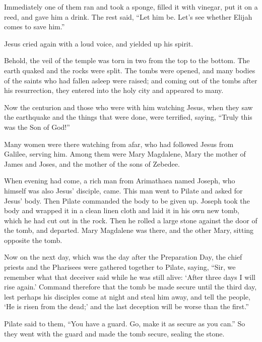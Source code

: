  Immediately one of them ran and took a sponge, filled it
with vinegar, put it on a reed, and gave him a drink. 
The rest said, ``Let him be. Let's see whether Elijah comes to save
him.''

 Jesus cried again with a loud voice, and yielded up his
spirit.

 Behold, the veil of the temple was torn in two from the
top to the bottom. The earth quaked and the rocks were split.
 The tombs were opened, and many bodies of the saints who
had fallen asleep were raised;  and coming out of the
tombs after his resurrection, they entered into the holy city and
appeared to many.

 Now the centurion and those who were with him watching
Jesus, when they saw the earthquake and the things that were done, were
terrified, saying, ``Truly this was the Son of God!''

 Many women were there watching from afar, who had
followed Jesus from Galilee, serving him.  Among them
were Mary Magdalene, Mary the mother of James and Joses, and the mother
of the sons of Zebedee.

 When evening had come, a rich man from Arimathaea named
Joseph, who himself was also Jesus' disciple, came.  This
man went to Pilate and asked for Jesus' body. Then Pilate commanded the
body to be given up.  Joseph took the body and wrapped it
in a clean linen cloth  and laid it in his own new tomb,
which he had cut out in the rock. Then he rolled a large stone against
the door of the tomb, and departed.  Mary Magdalene was
there, and the other Mary, sitting opposite the tomb.

 Now on the next day, which was the day after the
Preparation Day, the chief priests and the Pharisees were gathered
together to Pilate,  saying, ``Sir, we remember what that
deceiver said while he was still alive: `After three days I will rise
again.'  Command therefore that the tomb be made secure
until the third day, lest perhaps his disciples come at night and steal
him away, and tell the people, `He is risen from the dead;' and the last
deception will be worse than the first.''

 Pilate said to them, ``You have a guard. Go, make it as
secure as you can.''  So they went with the guard and
made the tomb secure, sealing the stone.

